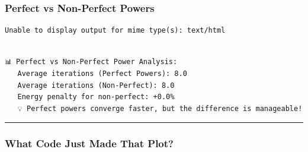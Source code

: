 \documentclass[
  letterpaper,
  DIV=11,
  numbers=noendperiod]{scrartcl}
\begin{document}
\subsubsection{Perfect vs Non-Perfect
Powers}\label{perfect-vs-non-perfect-powers}

\begin{verbatim}
Unable to display output for mime type(s): text/html
\end{verbatim}

\begin{verbatim}

📊 Perfect vs Non-Perfect Power Analysis:
   Average iterations (Perfect Powers): 8.0
   Average iterations (Non-Perfect): 8.0
   Energy penalty for non-perfect: +0.0%
   💡 Perfect powers converge faster, but the difference is manageable!
\end{verbatim}

\begin{center}\rule{0.5\linewidth}{0.5pt}\end{center}

\subsubsection{What Code Just Made That
Plot?}\label{what-code-just-made-that-plot}
\end{document}
